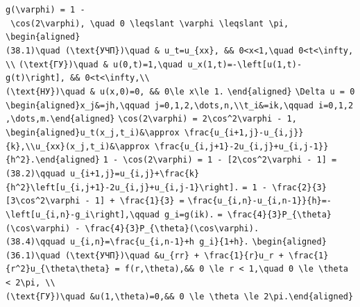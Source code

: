 \documentclass[
  ukrainian,
]{article}
\begin{document}
\texttt{g(\textbackslash{}varphi)\ =\ 1\ -\ \textbackslash{}cos(2\textbackslash{}varphi),\ \textbackslash{}quad\ 0\ \textbackslash{}leqslant\ \textbackslash{}varphi\ \textbackslash{}leqslant\ \textbackslash{}pi,}
\texttt{\textbackslash{}begin\{aligned\}}
\texttt{(38.1)\textbackslash{}quad\ (\textbackslash{}text\{УЧП\})\textbackslash{}quad\ \&\ u\_t=u\_\{xx\},\ \&\&\ 0\textless{}x\textless{}1,\textbackslash{}quad\ 0\textless{}t\textless{}\textbackslash{}infty,\textbackslash{}\textbackslash{}}
\texttt{(\textbackslash{}text\{ГУ\})\textbackslash{}quad\ \&\ u(0,t)=1,\textbackslash{}quad\ u\_x(1,t)=-\textbackslash{}left{[}u(1,t)-g(t)\textbackslash{}right{]},\ \&\&\ 0\textless{}t\textless{}\textbackslash{}infty,\textbackslash{}\textbackslash{}}
\texttt{(\textbackslash{}text\{НУ\})\textbackslash{}quad\ \&\ u(x,0)=0,\ \&\&\ 0\textbackslash{}le\ x\textbackslash{}le\ 1.}
\texttt{\textbackslash{}end\{aligned\}}
\texttt{\textbackslash{}Delta\ u\ =\ 0}
\texttt{\textbackslash{}begin\{aligned\}x\_j\&=jh,\textbackslash{}qquad\ j=0,1,2,\textbackslash{}dots,n,\textbackslash{}\textbackslash{}t\_i\&=ik,\textbackslash{}qquad\ i=0,1,2,\textbackslash{}dots,m.\textbackslash{}end\{aligned\}}
\texttt{\textbackslash{}cos(2\textbackslash{}varphi)\ =\ 2\textbackslash{}cos\^{}2\textbackslash{}varphi\ -\ 1,}
\texttt{\textbackslash{}begin\{aligned\}u\_t(x\_j,t\_i)\&\textbackslash{}approx\ \textbackslash{}frac\{u\_\{i+1,j\}-u\_\{i,j\}\}\{k\},\textbackslash{}\textbackslash{}u\_\{xx\}(x\_j,t\_i)\&\textbackslash{}approx\ \textbackslash{}frac\{u\_\{i,j+1\}-2u\_\{i,j\}+u\_\{i,j-1\}\}\{h\^{}2\}.\textbackslash{}end\{aligned\}}
\texttt{1\ -\ \textbackslash{}cos(2\textbackslash{}varphi)\ =\ 1\ -\ {[}2\textbackslash{}cos\^{}2\textbackslash{}varphi\ -\ 1{]}\ =}
\texttt{(38.2)\textbackslash{}qquad\ u\_\{i+1,j\}=u\_\{i,j\}+\textbackslash{}frac\{k\}\{h\^{}2\}\textbackslash{}left{[}u\_\{i,j+1\}-2u\_\{i,j\}+u\_\{i,j-1\}\textbackslash{}right{]}.}
\texttt{=\ 1\ -\ \textbackslash{}frac\{2\}\{3\}{[}3\textbackslash{}cos\^{}2\textbackslash{}varphi\ -\ 1{]}\ +\ \textbackslash{}frac\{1\}\{3\}\ =}
\texttt{\textbackslash{}frac\{u\_\{i,n\}-u\_\{i,n-1\}\}\{h\}=-\textbackslash{}left{[}u\_\{i,n\}-g\_i\textbackslash{}right{]},\textbackslash{}qquad\ g\_i=g(ik).}
\texttt{=\ \textbackslash{}frac\{4\}\{3\}P\_\{\textbackslash{}theta\}(\textbackslash{}cos\textbackslash{}varphi)\ -\ \textbackslash{}frac\{4\}\{3\}P\_\{\textbackslash{}theta\}(\textbackslash{}cos\textbackslash{}varphi).}
\texttt{(38.4)\textbackslash{}qquad\ u\_\{i,n\}=\textbackslash{}frac\{u\_\{i,n-1\}+h\ g\_i\}\{1+h\}.}
\texttt{\textbackslash{}begin\{aligned\}(36.1)\textbackslash{}quad\ (\textbackslash{}text\{УЧП\})\textbackslash{}quad\ \&u\_\{rr\}\ +\ \textbackslash{}frac\{1\}\{r\}u\_r\ +\ \textbackslash{}frac\{1\}\{r\^{}2\}u\_\{\textbackslash{}theta\textbackslash{}theta\}\ =\ f(r,\textbackslash{}theta),\&\&\ 0\ \textbackslash{}le\ r\ \textless{}\ 1,\textbackslash{}quad\ 0\ \textbackslash{}le\ \textbackslash{}theta\ \textless{}\ 2\textbackslash{}pi,\ \textbackslash{}\textbackslash{}(\textbackslash{}text\{ГУ\})\textbackslash{}quad\ \&u(1,\textbackslash{}theta)=0,\&\&\ 0\ \textbackslash{}le\ \textbackslash{}theta\ \textbackslash{}le\ 2\textbackslash{}pi.\textbackslash{}end\{aligned\}}
\end{document}
